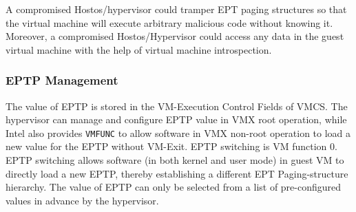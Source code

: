 A compromised Hostos/hypervisor could tramper EPT paging structures so that the virtual machine will execute arbitrary malicious code without knowing it. 
Moreover, a compromised Hostos/Hypervisor could access any data in the guest virtual machine with the help of virtual machine introspection.

\subsubsection{EPTP Management}%
\label{ssub:eptp_management}
The value of EPTP is stored in the VM-Execution Control Fields of VMCS. 
The hypervisor can manage and configure EPTP value in VMX root operation, while Intel also provides \verb|VMFUNC| to allow software in VMX non-root operation to load a new value for the EPTP without VM-Exit.
EPTP switching is VM function 0. EPTP switching allows software (in both kernel and user mode) in guest VM to directly load a new EPTP, thereby establishing a different EPT Paging-structure hierarchy. 
The value of EPTP can only be selected from a list of pre-configured values in advance by the hypervisor. 





